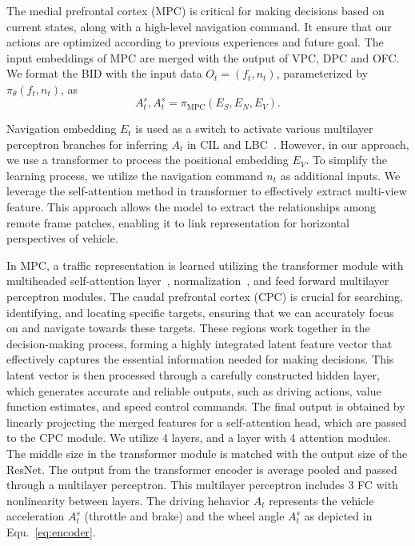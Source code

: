 The medial prefrontal cortex (MPC) is critical for making decisions based on current states, along with a high-level navigation command\cite{passingham2012neurobiology}.
It ensure that our actions are optimized according to previous experiences and future goal.
The input embeddings of MPC are merged with the output of VPC, DPC and OFC.
We format the BID with the input data $O_t=(f_t, n_t)$, parameterized by $ \pi_{\theta}(f_t, n_t) $, as
\begin{equation}\label{eq:encoder}
	A_t^s, A_t^s = \pi_\text{MPC}(E_S, E_N, E_V).
\end{equation}


Navigation embedding $E_{t}$ is used as a switch to activate various multilayer perceptron branches for inferring $A_{t}$ in CIL \cite{Codevilla:2018} and LBC~\cite{Codevilla:2019}. 
However, in our approach, we use a transformer to process the positional embedding $ E_V $.
To simplify the learning process, we utilize the navigation command $n_{t}$ as additional inputs.
%
We leverage the self-attention method in transformer to effectively extract multi-view feature\cite{Vaswani:2017}.
This approach allows the model to extract the relationships among remote frame patches, enabling it to link representation for horizontal perspectives of vehicle.


In MPC, a traffic representation is learned utilizing the transformer module with multiheaded self-attention layer~\cite{Vaswani:2017}, normalization~\cite{Ba:2016}, and feed forward multilayer perceptron modules. 
The caudal prefrontal cortex (CPC) is crucial for searching, identifying, and locating specific targets, ensuring that we can accurately focus on and navigate towards these targets\cite{lawler1987role}. 
These regions work together in the decision-making process, forming a highly integrated latent feature vector that effectively captures the essential information needed for making decisions\cite{wardak2004deficit}. 
This latent vector is then processed through a carefully constructed hidden layer, which generates accurate and reliable outputs, such as driving actions, value function estimates, and speed control commands.
The final output is obtained by linearly projecting the merged features for a self-attention head, which are passed to the CPC module.
We utilize 4 layers, and a layer with 4 attention modules. 
The middle size in the transformer module is matched with the output size of the ResNet.
%
The output from the transformer encoder is average pooled and passed through a multilayer perceptron.
This multilayer perceptron includes 3 FC with nonlinearity between layers.
The driving hehavior $A_t$ represents the vehicle acceleration $A_t^s$ (throttle and brake) and the wheel angle $A_t^s$ as depicted in Equ.~\ref{eq:encoder}. 





